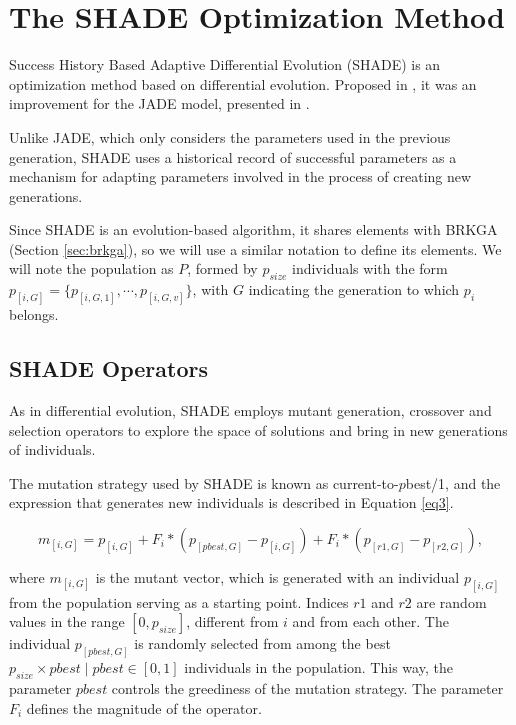 \documentclass[review]{elsarticle}
\begin{document}
\section{The SHADE Optimization Method} \label{sec:SHADE}

Success History Based Adaptive Differential Evolution (SHADE) is an optimization method based on differential evolution. Proposed in \cite{tanabe2013success}, it was an improvement for the JADE model, presented in \cite{zhang2009jade}.

Unlike JADE, which only considers the parameters used in the previous generation, SHADE uses a historical record of successful parameters as a mechanism for adapting parameters involved in the process of creating new generations.

Since SHADE is an evolution-based algorithm, it shares elements with BRKGA (Section \ref{sec:brkga}), so we will use a similar notation to define its elements. We will note the population as $P$, formed by $p_{size}$ individuals with the form $p_{[i,G]} = \{p_{[i,G,1]}, \cdots, p_{[i,G,v]}\}$, with $G$ indicating the generation to which $p_i$ belongs.

\subsection{SHADE Operators}

As in differential evolution, SHADE employs mutant generation, crossover and selection operators to explore the space of solutions and bring in new generations of individuals.

The mutation strategy used by SHADE is known as current-to-$p$best/1, and the expression that generates new individuals is described in Equation \eqref{eq3}.

\begin{equation}
m_{[i,G]} = p_{[i,G]} + F_i * (p_{[pbest, G]} - p_{[i,G]}) + F_i * (p_{[r1, G]} - p_{[r2,G]}),
\label{eq3}
\end{equation}

\noindent where $m_{[i,G]}$ is the mutant vector, which is generated with an individual $p_{[i,G]}$ from the population serving as a starting point. Indices $r1$ and $r2$ are random values in the range $[0,p_{size}]$, different from $i$ and from each other. The individual $p_{[pbest, G]}$ is randomly selected from among the best $p_{size} \times pbest\;|\;pbest\in [0,1]$ individuals in the population. This way, the parameter $pbest$ controls the greediness of the mutation strategy. The parameter $F_i$ defines the magnitude of the operator.
\end{document}
